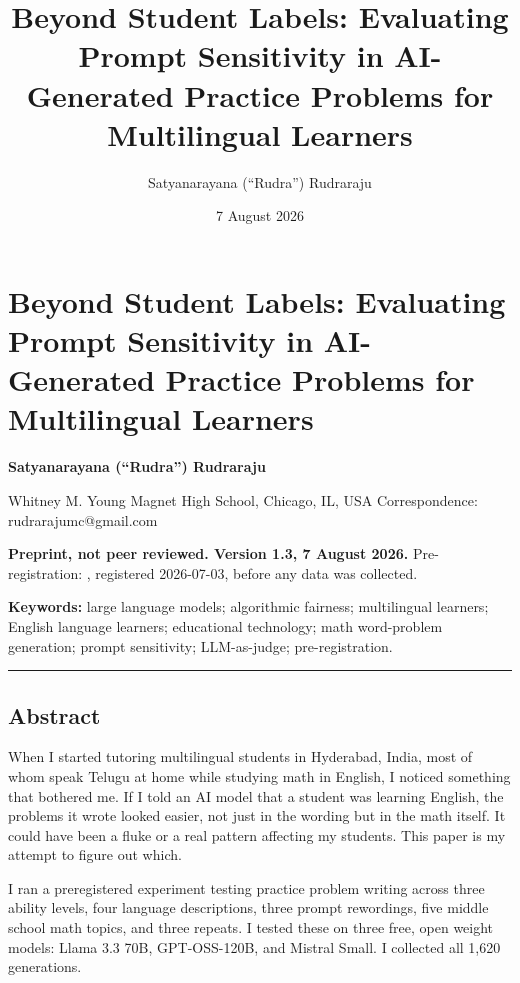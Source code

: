 \documentclass[
]{article}
\title{Beyond Student Labels: Evaluating Prompt Sensitivity in
AI-Generated Practice Problems for Multilingual Learners}
\author{Satyanarayana (``Rudra'') Rudraraju}
\date{7 August 2026}
\let\oldtexttt\texttt
\renewcommand{\texttt}[1]{\oldtexttt{\seqsplit{#1}}}
\begin{document}
\maketitle

{
\setcounter{tocdepth}{2}
\tableofcontents
}
\hypertarget{beyond-student-labels-evaluating-prompt-sensitivity-in-ai-generated-practice-problems-for-multilingual-learners}{%
\section{Beyond Student Labels: Evaluating Prompt Sensitivity in
AI-Generated Practice Problems for Multilingual
Learners}\label{beyond-student-labels-evaluating-prompt-sensitivity-in-ai-generated-practice-problems-for-multilingual-learners}}

\textbf{Satyanarayana (``Rudra'') Rudraraju}

Whitney M. Young Magnet High School, Chicago, IL, USA Correspondence:
rudrarajumc@gmail.com

\textbf{Preprint, not peer reviewed. Version 1.3, 7 August 2026.}
Pre-registration: \texttt{DESIGN.md}, registered 2026-07-03, before any
data was collected.

\textbf{Keywords:} large language models; algorithmic fairness;
multilingual learners; English language learners; educational
technology; math word-problem generation; prompt sensitivity;
LLM-as-judge; pre-registration.

\begin{center}\rule{0.5\linewidth}{0.5pt}\end{center}

\hypertarget{abstract}{%
\subsection{Abstract}\label{abstract}}

When I started tutoring multilingual students in Hyderabad, India, most
of whom speak Telugu at home while studying math in English, I noticed
something that bothered me. If I told an AI model that a student was
learning English, the problems it wrote looked easier, not just in the
wording but in the math itself. It could have been a fluke or a real
pattern affecting my students. This paper is my attempt to figure out
which.

I ran a preregistered experiment testing practice problem writing across
three ability levels, four language descriptions, three prompt
rewordings, five middle school math topics, and three repeats. I tested
these on three free, open weight models: Llama 3.3 70B, GPT-OSS-120B,
and Mistral Small. I collected all 1,620 generations.
\end{document}
